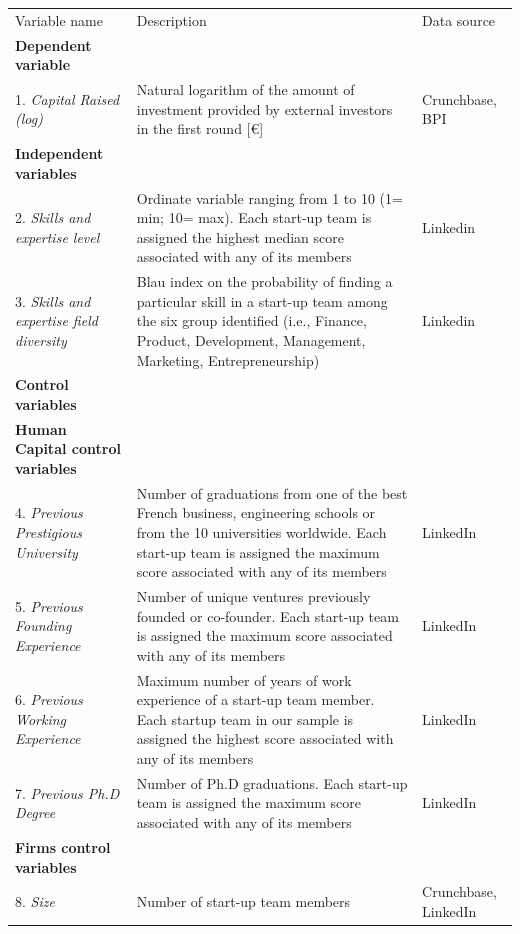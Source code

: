 \documentclass[12pt]{article}
\begin{document}
\begin{table} [ht]
\scriptsize
\renewcommand{\arraystretch}{1.5}
\begin{tabularx}{\textwidth}{ p{5cm} p{7cm} p{2.2cm} }
\toprule
\multicolumn{1}{l}{Variable name}&\multicolumn{1}{l}{Description}&\multicolumn{1}{l}{Data source}\\
\cmidrule(r){1-3}
\textbf{Dependent variable}& &\\
1. \textit{Capital Raised (log)} & Natural logarithm of the amount of investment provided by external investors in the first round [€] & Crunchbase, BPI \\
\cmidrule(r){2-3}
\textbf{Independent variables}& &\\
2. \textit{Skills and expertise level} & Ordinate variable ranging from 1 to 10 (1= min; 10= max). Each start-up team is assigned the highest median score associated with any of its members & Linkedin\\
3. \textit{Skills and expertise field diversity} & Blau index on the probability of finding a particular skill in a start-up team among the six group identified (i.e., Finance, Product, Development, Management, Marketing, Entrepreneurship) & Linkedin \\
\cmidrule(r){2-3}
\textbf{Control variables}& &\\
\textbf{Human Capital control variables}& &\\
4. \textit{Previous Prestigious University} & Number of graduations from one of the best French business, engineering schools or from the 10 universities worldwide. Each start-up team is assigned the maximum score associated with any of its members & LinkedIn\\
5. \textit{Previous Founding Experience} & Number of unique ventures previously founded or co-founder. Each start-up team is assigned the maximum score associated with any of its members & LinkedIn\\
6. \textit{Previous Working Experience} & Maximum number of years of work experience of a start-up team member. Each startup team in our sample is assigned the highest score associated with any of its members & LinkedIn\\
7. \textit{Previous Ph.D Degree} & Number of Ph.D graduations. Each start-up team is assigned the maximum score associated with any of its members & LinkedIn\\
\textbf{Firms control variables}& &\\
8. \textit{Size} & Number of start-up team members & Crunchbase, LinkedIn\\

\end{tabularx}
\end{table}
\end{document}
